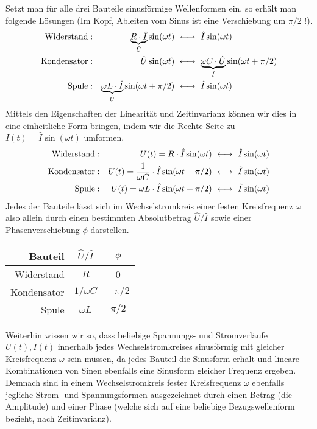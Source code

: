 Setzt man für alle drei Bauteile sinusförmige Wellenformen ein, so erhält man folgende Lösungen (Im Kopf, Ableiten vom
Sinus ist eine Verschiebung um $\pi/2$ !).
\begin{align*}
    \text{Widerstand} &: & \underbrace{R\cdot \hat I}_{\hat U}\sin(\omega t)
    & ~\longleftrightarrow~ \hat{I}\sin(\omega t)
    \\
    \text{Kondensator} &: & \hat U\sin(\omega t)
    & ~\longleftrightarrow~ \underbrace{\omega C \cdot \hat U}_{\hat{I}}\sin(\omega t + \pi/2)
    \\
\text{Spule} &: &  \underbrace{\omega L\cdot \hat I}_{\hat U}\sin(\omega t + \pi/2)
    & ~\longleftrightarrow~ \hat{I}\sin(\omega t)
\end{align*}
Mittels den Eigenschaften der Linearität und Zeitinvarianz können wir dies in eine einheitliche Form bringen, indem wir
die Rechte Seite zu $I(t) = \hat I\sin(\omega t)$ umformen.
\begin{align*}
    \text{Widerstand} &: & U(t) = R \cdot \hat I\sin(\omega t)
    & ~\longleftrightarrow~ \hat{I}\sin(\omega t)
    \\
    \text{Kondensator} &: & U(t) = {1\over \omega C}\cdot  \hat I\sin(\omega t - \pi/2)
    & ~\longleftrightarrow~ \hat{I}\sin(\omega t)
    \\
\text{Spule} &: &  U(t) = \omega L \cdot \hat I\sin(\omega t + \pi/2)
    & ~\longleftrightarrow~ \hat{I}\sin(\omega t)
\end{align*}
Jedes der Bauteile lässt sich im Wechselstromkreis einer festen Kreisfrequenz $\omega$ also allein durch einen
bestimmten Absolutbetrag $\hat U / \hat I$ sowie einer Phasenverschiebung $\phi$ darstellen.
\begin{center}
    \begin{tabular}{rcc}
        Bauteil & $\hat U / \hat I$ & $\phi$ \\
        \hline
        Widerstand & $R$ & 0 \\
        Kondensator & ${1/\omega C}$ & $-\pi/2$ \\
        Spule & $\omega L$ & $\pi/2$
    \end{tabular}
\end{center}

Weiterhin wissen wir so, dass beliebige Spannungs- und Stromverläufe $U(t), I(t)$ innerhalb jedes Wechselstromkreises
sinusförmig mit gleicher Kreisfrequenz $\omega$ sein müssen, da jedes Bauteil die Sinusform erhält und lineare
Kombinationen von Sinen ebenfalls eine Sinusform gleicher Frequenz ergeben. Demnach sind in einem Wechselstromkreis
fester Kreisfrequenz $\omega$ ebenfalls jegliche Strom- und Spannungsformen ausgezeichnet durch einen Betrag (die
Amplitude) und einer Phase (welche sich auf eine beliebige Bezugswellenform bezieht, nach Zeitinvarianz).

